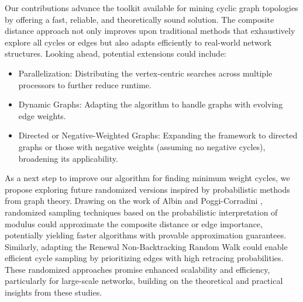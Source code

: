 \documentclass{article}
\begin{document}
Our contributions advance the toolkit available for mining cyclic graph topologies by offering a fast, reliable, and theoretically sound solution. The composite distance approach not only improves upon traditional methods that exhaustively explore all cycles or edges but also adapts efficiently to real-world network structures. Looking ahead, potential extensions could include:
\begin{itemize}
    \item Parallelization: Distributing the vertex-centric searches across multiple processors to further reduce runtime.
    \item Dynamic Graphs: Adapting the algorithm to handle graphs with evolving edge weights.
    \item Directed or Negative-Weighted Graphs: Expanding the framework to directed graphs or those with negative weights (assuming no negative cycles), broadening its applicability.
\end{itemize}
As a next step to improve our algorithm for finding minimum weight cycles, we propose exploring future randomized versions inspired by probabilistic methods from graph theory. Drawing on the work of Albin and Poggi-Corradini \cite{albin2016minimal}, randomized sampling techniques based on the probabilistic interpretation of modulus could approximate the composite distance or edge importance, potentially yielding faster algorithms with provable approximation guarantees. Similarly, adapting the Renewal Non-Backtracking Random Walk \cite{moradi2021new} could enable efficient cycle sampling by prioritizing edges with high retracing probabilities. These randomized approaches promise enhanced scalability and efficiency, particularly for large-scale networks, building on the theoretical and practical insights from these studies.


 
\end{document}

